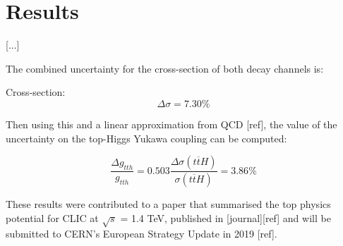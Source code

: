 


\section{Results}
[...] 

The combined uncertainty for the cross-section of both decay channels is:

Cross-section: $$\Delta\sigma = 7.30\% $$

Then using this and a linear approximation from \acrshort{QCD} [ref], the value of the uncertainty on the top-Higgs Yukawa coupling can be computed:

$$\frac{\Delta g_{tth}}{g_{tth}} = 0.503 \frac{\Delta\sigma(t\overline{t}H)}{\sigma(t\overline{t}H)} = 3.86\% $$

These results were contributed to a paper that summarised the top physics potential for \acrshort{CLIC} at $\sqrt{s}$ = 1.4 TeV, published in [journal][ref] and will be submitted to CERN's European Strategy Update in 2019 [ref].










